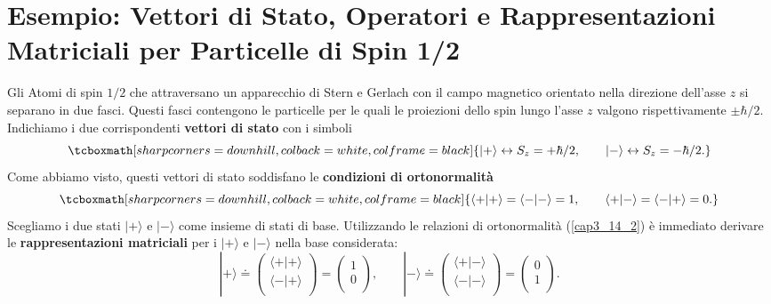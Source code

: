 \documentclass[a4paper,12pt,oneside]{book}
\begin{document}
\section[Esempio:Particelle di Spin 1/2]{Esempio: Vettori di Stato, Operatori e Rappresentazioni Matriciali per Particelle di Spin 1/2}
Gli Atomi di spin $1/2$ che attraversano un apparecchio di Stern e Gerlach con il campo magnetico orientato nella direzione dell'asse $z$ si separano in due fasci. Questi fasci contengono le particelle per le quali le proiezioni dello spin lungo l'asse $z$ valgono rispettivamente $\pm \hbar/2$. Indichiamo i due corrispondenti \textbf{vettori di stato} con i simboli
	\begin{equation}
		\tcboxmath[sharp corners=downhill, colback=white, colframe=black]{
		| + \rangle \leftrightarrow S_z= +\hbar/2, \qquad | - \rangle \leftrightarrow S_z=-\hbar/2 .
		}
	\label{cap3_14}
	\end{equation}
Come abbiamo visto, questi vettori di stato soddisfano le \textbf{condizioni di ortonormalità}
	\begin{equation}
		\tcboxmath[sharp corners=downhill, colback=white, colframe=black]{
			\langle + | + \rangle = \langle - | - \rangle =1,\qquad \langle + | - \rangle = \langle - | + \rangle =0 .
			}
	\label{cap3_14_2}
	\end{equation}
Scegliamo i due stati $| + \rangle $ e $ | - \rangle$ come insieme di stati di base. Utilizzando le relazioni di ortonormalità (\ref{cap3_14_2}) è immediato derivare le \textbf{rappresentazioni matriciali} per i $| + \rangle$ e $| - \rangle$ nella base considerata:
	\begin{equation}
		| + \rangle \doteq
		\begin{pmatrix}
		\langle + | + \rangle \\
		\langle - | + \rangle \\
		\end{pmatrix} = 
		\begin{pmatrix}
		1 \\
		0 \\
		\end{pmatrix}, \qquad
		| - \rangle \doteq
		\begin{pmatrix}
		\langle + | - \rangle \\
		\langle - | - \rangle \\
		\end{pmatrix} = 
		\begin{pmatrix}
		0 \\
		1 \\
		\end{pmatrix} .
	\end{equation}
\end{document}
